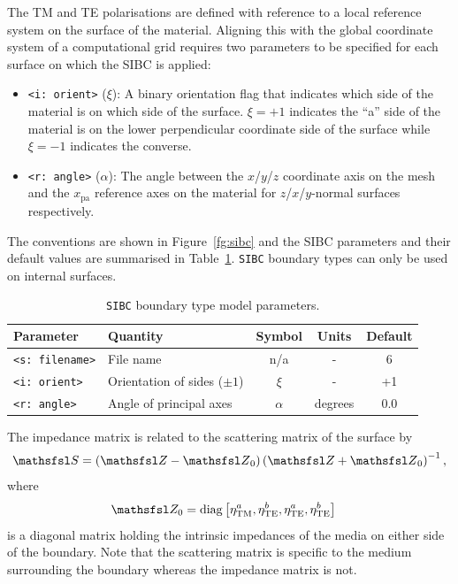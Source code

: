 \documentclass[onecolumn,a4paper]{article}
\numberwithin{equation}{section}
\begin{document}
The TM and TE polarisations are defined with reference to a local reference system on the 
surface of the material. Aligning this with the global coordinate system of a computational 
grid requires two parameters to be specified for each surface on which the SIBC is applied:
\begin{itemize}
 \item \texttt{<i:~orient>} ($\xi$): A binary orientation flag that indicates which side of 
 the material is on which side of the surface. $\xi=+1$ indicates the ``a'' side of the material is on the lower
 perpendicular coordinate side of the surface while $\xi=-1$ indicates the converse.
 \item \texttt{<r:~angle>} ($\alpha$): The angle between the $x$/$y$/$z$ coordinate axis on the mesh 
 and the $x_\mathrm{pa}$ reference axes on the material for $z$/$x$/$y$-normal surfaces respectively.
\end{itemize}
The conventions are shown in Figure~\ref{fg:sibc} and the SIBC parameters and their default values 
are summarised in Table~\ref{tb:tbsibc}. \texttt{SIBC} boundary types can only be used on internal surfaces.

\begin{table}[ht]
\begin{center}
\begin{tabular}{|l||l|c|c|c|}
\hline
Parameter              &Quantity                       &Symbol   &Units    &Default  \\  
\hline
\texttt{<s:~filename>} &File name                      &n/a      &-        &6        \\
\texttt{<i:~orient>}   &Orientation of sides ($\pm 1$) &$\xi$    &-        &+1       \\
\texttt{<r:~angle>}    &Angle of principal axes        &$\alpha$ &degrees  &0.0      \\ 
\hline
\end{tabular}
\caption{\label{tb:tbsibc}\texttt{SIBC} boundary type model parameters.}
\end{center}
\end{table}

The impedance matrix is related to the scattering matrix of the surface by
\begin{eqnarray}
\mS
=
\left( \mZ - {\mZ}_0 \right)
\left( \mZ + {\mZ}_0 \right)^{-1},
\end{eqnarray}
where
\begin{align}
\mZ_0 &= \mathrm{diag} \left[ \eta_\mathrm{TM}^a , \eta_\mathrm{TE}^b , \eta_\mathrm{TE}^a, \eta_\mathrm{TE}^b \right]
\end{align}
is a diagonal matrix holding the intrinsic impedances of the media on either side of the boundary.
Note that the scattering matrix is specific to the medium surrounding the boundary whereas the impedance
matrix is not. 
\end{document}
